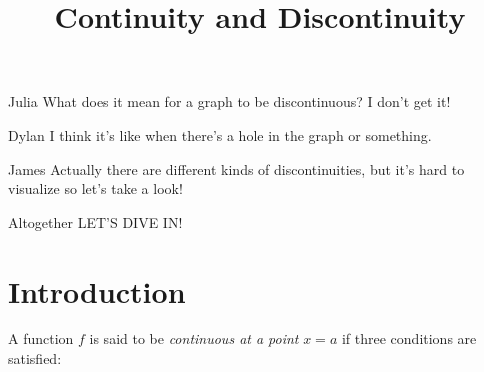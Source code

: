 \documentclass{ximera}
\begin{document}
\title{Continuity and Discontinuity}
\begin{dialogue}
\item[Julia]What does it mean for a graph to be discontinuous? I don't get it!
\item[Dylan] I think it's like when there's a hole in the graph or something.
\item[James] Actually there are different kinds of discontinuities, but it's hard to visualize so let's take a look!
\item[Altogether] LET'S DIVE IN!
\end{dialogue}
\section{Introduction}
A function $f$ is said to be \textit{continuous at a point} $x = a$ if three conditions are satisfied:
\end{document}
